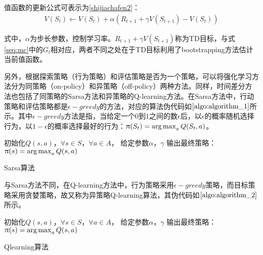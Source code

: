 值函数的更新公式可表示为\eqref{shijiachafen2}：
\begin{equation}\label{shijiachafen2}
\begin{aligned}
V(S_{t}) \gets V(S_{t})+\alpha (R_{t+1}+\gamma V(S_{t+1})-V(S_{t}))
\end{aligned}
\end{equation}

式中，$\alpha$为步长参数，控制学习率。$R_{t+1}+\gamma V(S_{t+1})$称为TD目标，与式\eqref{seq:mc}中的$G_{t}$相对应，两者不同之处在于TD目标利用了bootstrapping方法估计当前值函数。

另外，根据探索策略（行为策略）和评估策略是否为一个策略，可以将强化学习方法分为同策略（on-policy）和异策略（off-policy）两种方法。同样，时间差分方法也包括了同策略的Sarsa方法和异策略的Q-learning方法。在Sarsa方法中，行动策略和评估策略都是$\epsilon-greedy$的方法，对应的算法伪代码如$\ref{algo:algorithm_1}$所示。其中$\epsilon-greedy$方法是指，当给定一个$0$到$1$之间的数$\epsilon$后，以$\epsilon$的概率随机选择行为，以$1-\epsilon$的概率选择最好的行为：$\uppi(S_{t})=\operatorname*{arg\,max}_{a} Q(S_{t},a)$。

\begin{algorithm}[htbp]
\small
\SetAlgoLined
{} 
初始化$Q(s,a)$，$\forall s \in S$，$\forall a \in A$， 给定参数$\alpha$，$\gamma$\;
输出最终策略：$\uppi(s)=\operatorname*{arg\,max}_{a}Q(s,a)$\;
\caption{Sarsa算法}
\label{algo:algorithm_1}
\end{algorithm}

与Sarsa方法不同，在Q-learning方法中，行为策略采用$\epsilon-greedy$策略，而目标策略采用贪婪策略，故又称为异策略Q-learning算法，其伪代码如$\ref{algo:algorithm_2}$所示。
\begin{algorithm}[htbp]
\small
\SetAlgoLined
{} 
初始化$Q(s,a)$，$\forall s \in S$，$\forall a \in A$， 给定参数$\alpha$，$\gamma$\;
输出最终策略：$\uppi(s)=\operatorname*{arg\,max}_{a}Q(s,a)$\;
\caption{Qlearning算法}
\label{algo:algorithm_2}
\end{algorithm}


